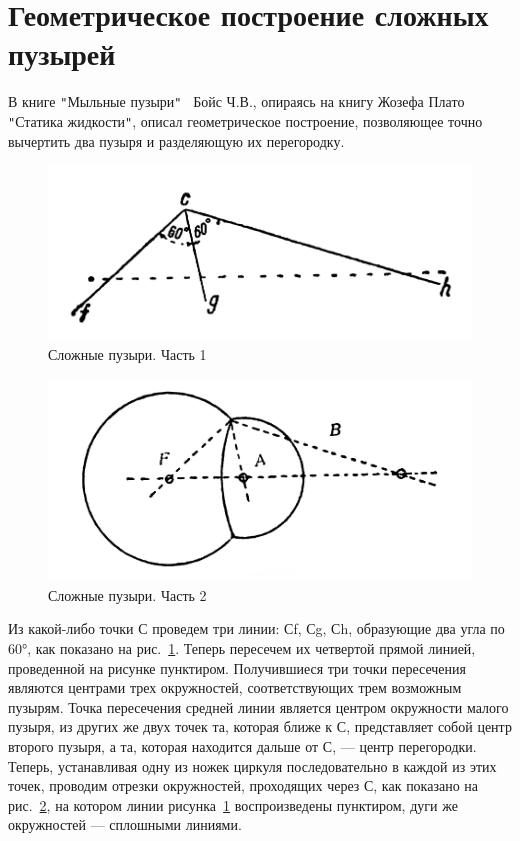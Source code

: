 \section{Геометрическое построение сложных пузырей}

В книге \verb|"|Мыльные пузыри\verb|"|~\cite{boys} Бойс Ч.В., опираясь на книгу  Жозефа Плато \verb|"|Статика жидкости\verb|"|, описал геометрическое построение, позволяющее точно вычертить два пузыря и разделяющую их перегородку.

\begin{figure}[h]
	\centering
	\includegraphics[width=0.5\linewidth]{pictures/drawing_cluster_1.png}
	\caption{Сложные пузыри. Часть 1}
	\label{fig:drawing_cluster_1}
\end{figure}
\begin{figure}[h]
	\centering
	\includegraphics[width=0.7\linewidth]{pictures/drawing_cluster_2.png}
	\caption{Сложные пузыри. Часть 2}
	\label{fig:drawing_cluster_2}
\end{figure}

Из какой-либо точки С проведем три линии: 
Сf, Сg, Сh, образующие два угла по 60°, как показано 
на рис.~\ref{fig:drawing_cluster_1}. Теперь пересечем их четвертой прямой линией, проведенной на рисунке пунктиром. Получившиеся три точки пересечения являются центрами трех окружностей, соответствующих трем возможным пузырям. 
Точка пересечения средней линии является центром 
окружности малого пузыря, из других же двух точек 
та, которая ближе к С, представляет собой центр второго пузыря, а та, которая находится дальше от С, — центр перегородки. Теперь, устанавливая одну из ножек циркуля последовательно в каждой из этих точек, проводим отрезки окружностей, проходящих через С, как показано на рис.~\ref{fig:drawing_cluster_2}, на котором линии рисунка~\ref{fig:drawing_cluster_1} воспроизведены пунктиром, дуги же окружностей — сплошными линиями.


